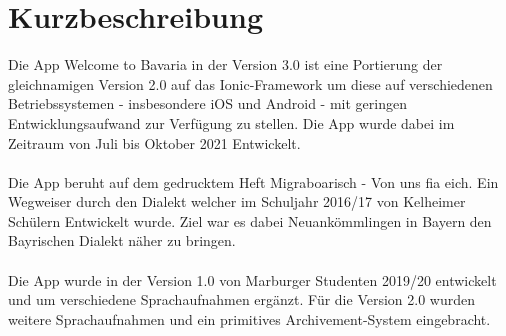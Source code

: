 
\section{Kurzbeschreibung}
Die App \glqq Welcome to Bavaria\grqq{} in der Version 3.0 ist eine Portierung der gleichnamigen Version 2.0 auf das Ionic-Framework um diese auf verschiedenen Betriebssystemen - insbesondere iOS und Android - mit geringen Entwicklungsaufwand zur Verfügung zu stellen. Die App wurde dabei im Zeitraum von Juli bis Oktober 2021 Entwickelt.\\\\
Die App beruht auf dem gedrucktem Heft \glqq Migraboarisch - Von uns fia eich. Ein Wegweiser durch den Dialekt\grqq{} welcher im Schuljahr 2016/17 von Kelheimer Schülern Entwickelt wurde. Ziel war es dabei Neuankömmlingen in Bayern den Bayrischen Dialekt näher zu bringen.\\\\
Die App wurde in der Version 1.0 von Marburger Studenten 2019/20 entwickelt und um verschiedene Sprachaufnahmen ergänzt. Für die Version 2.0 wurden weitere Sprachaufnahmen und ein primitives Archivement-System eingebracht.

